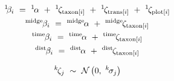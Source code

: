 \begin{equation} \label{eq:betas}
\begin{gathered}
{}^1\hspace*{-1pt}\hspace*{-1pt}\beta_i~=~{}^1\hspace*{-1pt}\alpha~+~{}^1\hspace*{-1pt}\zeta_{\text{taxon}[i]}~+~
        {}^1\hspace*{-1pt}\zeta_{\text{trans}[i]}~+~{}^1\hspace*{-1pt}\zeta_{\text{plot}[i]} \\
{}^\text{midge}\hspace*{-1pt}\beta_i~=~{}^\text{midge}\hspace*{-1pt}\alpha~+~
        {}^\text{midge}\hspace*{-1pt}\zeta_{\text{taxon}[i]} \\
{}^\text{time}\hspace*{-1pt}\beta_i~=~{}^\text{time}\hspace*{-1pt}\alpha~+~
        {}^\text{time}\hspace*{-1pt}\zeta_{\text{taxon}[i]} \\
{}^\text{dist}\hspace*{-1pt}\beta_i~=~{}^\text{dist}\hspace*{-1pt}\alpha~+~
        {}^\text{dist}\hspace*{-1pt}\zeta_{\text{taxon}[i]}
\end{gathered}
\end{equation}

\begin{equation} \label{eq:zetas}
{}^k\hspace*{-1pt}\zeta_j~\sim~\mathcal{N}\left(0,~{}^k\hspace*{-1pt}\sigma_j\right)
\end{equation}
